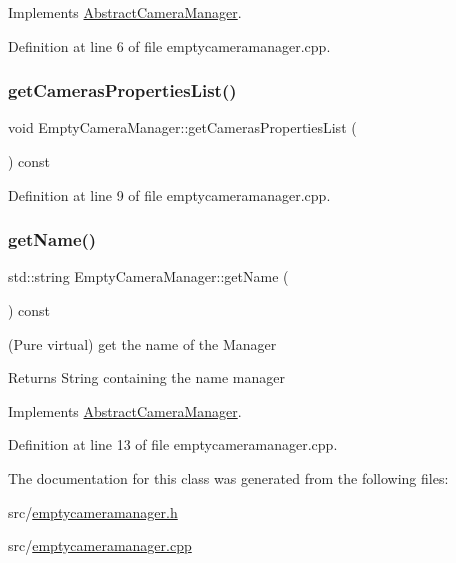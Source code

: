 Implements \mbox{\hyperlink{class_abstract_camera_manager_a8e215b2531fd8c18551382dc8f571817}{Abstract\+Camera\+Manager}}.



Definition at line 6 of file emptycameramanager.\+cpp.

\mbox{\label{class_empty_camera_manager_a9378dbcd5782dc5ed032a022b9d18881}} 
\subsubsection{\texorpdfstring{getCamerasPropertiesList()}{getCamerasPropertiesList()}}
{\footnotesize\ttfamily void Empty\+Camera\+Manager\+::get\+Cameras\+Properties\+List (\begin{DoxyParamCaption}{ }\end{DoxyParamCaption}) const\hspace{0.3cm}{\ttfamily [virtual]}}



Definition at line 9 of file emptycameramanager.\+cpp.

\mbox{\label{class_empty_camera_manager_a9956650ba2c7ec4d18029c896311ac8e}} 
\subsubsection{\texorpdfstring{getName()}{getName()}}
{\footnotesize\ttfamily std\+::string Empty\+Camera\+Manager\+::get\+Name (\begin{DoxyParamCaption}{ }\end{DoxyParamCaption}) const\hspace{0.3cm}{\ttfamily [virtual]}}



(Pure virtual) get the name of the Manager 

\begin{DoxyReturn}{Returns}
String containing the name manager 
\end{DoxyReturn}


Implements \mbox{\hyperlink{class_abstract_camera_manager_a6e4b041842471b9ed42ddd5c9ab260d1}{Abstract\+Camera\+Manager}}.



Definition at line 13 of file emptycameramanager.\+cpp.



The documentation for this class was generated from the following files\+:\begin{DoxyCompactItemize}
\item 
src/\mbox{\hyperlink{emptycameramanager_8h}{emptycameramanager.\+h}}\item 
src/\mbox{\hyperlink{emptycameramanager_8cpp}{emptycameramanager.\+cpp}}\end{DoxyCompactItemize}
